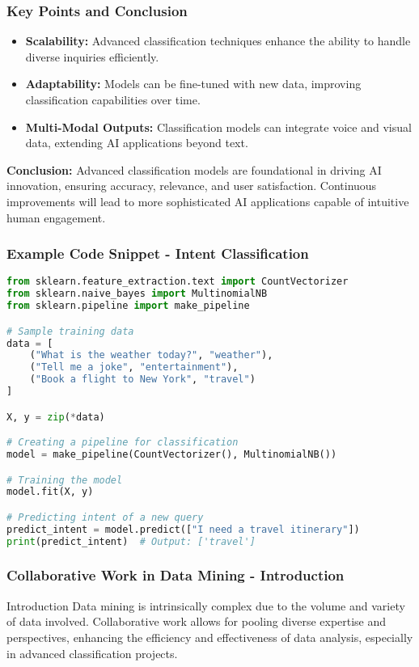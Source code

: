 \documentclass[aspectratio=169]{beamer}
\begin{document}
\begin{frame}
    \frametitle{Key Points and Conclusion}
    \begin{itemize}
        \item \textbf{Scalability:} Advanced classification techniques enhance the ability to handle diverse inquiries efficiently.
        \item \textbf{Adaptability:} Models can be fine-tuned with new data, improving classification capabilities over time.
        \item \textbf{Multi-Modal Outputs:} Classification models can integrate voice and visual data, extending AI applications beyond text.
    \end{itemize}
    
    \textbf{Conclusion:} Advanced classification models are foundational in driving AI innovation, ensuring accuracy, relevance, and user satisfaction. Continuous improvements will lead to more sophisticated AI applications capable of intuitive human engagement.
\end{frame}

\begin{frame}[fragile]
    \frametitle{Example Code Snippet - Intent Classification}
    \begin{lstlisting}[language=Python]
from sklearn.feature_extraction.text import CountVectorizer
from sklearn.naive_bayes import MultinomialNB
from sklearn.pipeline import make_pipeline

# Sample training data
data = [
    ("What is the weather today?", "weather"),
    ("Tell me a joke", "entertainment"),
    ("Book a flight to New York", "travel")
]

X, y = zip(*data)

# Creating a pipeline for classification
model = make_pipeline(CountVectorizer(), MultinomialNB())

# Training the model
model.fit(X, y)

# Predicting intent of a new query
predict_intent = model.predict(["I need a travel itinerary"])
print(predict_intent)  # Output: ['travel']
    \end{lstlisting}
\end{frame}

\begin{frame}[fragile]
    \frametitle{Collaborative Work in Data Mining - Introduction}
    \begin{block}{Introduction}
        Data mining is intrinsically complex due to the volume and variety of data involved. 
        Collaborative work allows for pooling diverse expertise and perspectives, enhancing the efficiency and effectiveness of data analysis, especially in advanced classification projects.
    \end{block}
\end{frame}
\end{document}
